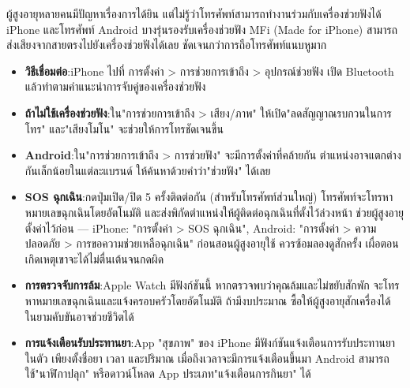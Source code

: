 
ผู้สูงอายุหลายคนมีปัญหาเรื่องการได้ยิน แต่ไม่รู้ว่าโทรศัพท์สามารถทำงานร่วมกับเครื่องช่วยฟังได้ iPhone และโทรศัพท์ Android บางรุ่นรองรับเครื่องช่วยฟัง MFi (Made for iPhone) สามารถส่งเสียงจากสายตรงไปยังเครื่องช่วยฟังได้เลย ชัดเจนกว่าการถือโทรศัพท์แนบหูมาก

\begin{itemize}
  \item \textbf{วิธีเชื่อมต่อ}:iPhone ไปที่ การตั้งค่า > การช่วยการเข้าถึง > อุปกรณ์ช่วยฟัง เปิด Bluetooth แล้วทำตามคำแนะนำการจับคู่ของเครื่องช่วยฟัง
  \item \textbf{ถ้าไม่ใช้เครื่องช่วยฟัง}:ใน"การช่วยการเข้าถึง > เสียง/ภาพ" ให้เปิด"ลดสัญญาณรบกวนในการโทร" และ"เสียงโมโน" จะช่วยให้การโทรชัดเจนขึ้น
  \item \textbf{Android}:ใน"การช่วยการเข้าถึง > การช่วยฟัง" จะมีการตั้งค่าที่คล้ายกัน ตำแหน่งอาจแตกต่างกันเล็กน้อยในแต่ละแบรนด์ ให้ค้นหาด้วยคำว่า"ช่วยฟัง" ได้เลย
\end{itemize}


\begin{itemize}
  \item \textbf{SOS ฉุกเฉิน}:กดปุ่มเปิด/ปิด 5 ครั้งติดต่อกัน (สำหรับโทรศัพท์ส่วนใหญ่) โทรศัพท์จะโทรหาหมายเลขฉุกเฉินโดยอัตโนมัติ และส่งพิกัดตำแหน่งให้ผู้ติดต่อฉุกเฉินที่ตั้งไว้ล่วงหน้า ช่วยผู้สูงอายุตั้งค่าไว้ก่อน — iPhone: "การตั้งค่า > SOS ฉุกเฉิน", Android: "การตั้งค่า > ความปลอดภัย > การขอความช่วยเหลือฉุกเฉิน" ก่อนสอนผู้สูงอายุใช้ ควรซ้อมลองดูสักครั้ง เผื่อตอนเกิดเหตุเขาจะได้ไม่ตื่นเต้นจนกดผิด
  \item \textbf{การตรวจจับการล้ม}:Apple Watch มีฟังก์ชันนี้ หากตรวจพบว่าคุณล้มและไม่ขยับสักพัก จะโทรหาหมายเลขฉุกเฉินและแจ้งครอบครัวโดยอัตโนมัติ ถ้ามีงบประมาณ ซื้อให้ผู้สูงอายุสักเครื่องได้ ในยามคับขันอาจช่วยชีวิตได้
  \item \textbf{การแจ้งเตือนรับประทานยา}:App "สุขภาพ" ของ iPhone มีฟังก์ชันแจ้งเตือนการรับประทานยาในตัว เพียงตั้งชื่อยา เวลา และปริมาณ เมื่อถึงเวลาจะมีการแจ้งเตือนขึ้นมา Android สามารถใช้"นาฬิกาปลุก" หรือดาวน์โหลด App ประเภท"แจ้งเตือนการกินยา" ได้
\end{itemize}


